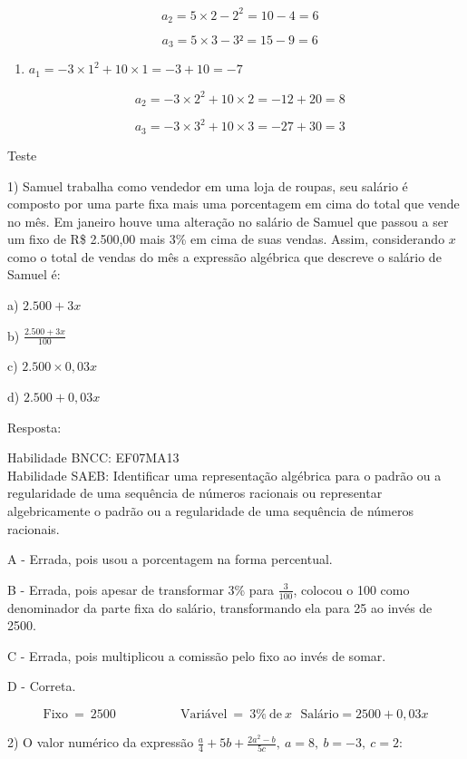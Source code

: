 {\[\text{\ \ \ \ \ }a_{2} = 5 \times 2 - 2^2 = 10 - 4 = 6\]

\[{\text{\ \ \ \ \ }a}_{3} = 5 \times 3 - 3² = 15 - 9 = 6\]

\begin{enumerate}
\def\labelenumi{\alph{enumi})}
\setcounter{enumi}{3}
\tightlist
\item
  \(a_{1} = - 3 \times 1^{2} + 10 \times 1 = - 3 + 10 = - 7\)
\end{enumerate}

\[\text{\ \ \ \ \ }a_{2} = - 3 \times 2^{2} + 10 \times 2 = - 12 + 20 = 8\]

\[{\text{\ \ \ \ \ }a}_{3} = - 3 \times 3^{2} + 10 \times 3 = - 27 + 30 = 3\]

Teste

1) Samuel trabalha como vendedor em uma loja de roupas, seu salário é
composto por uma parte fixa mais uma porcentagem em cima do total que
vende no mês. Em janeiro houve uma alteração no salário de Samuel que
passou a ser um fixo de R\$ 2.500,00 mais 3\% em cima de suas vendas.
Assim, considerando \(x\) como o total de vendas do mês a expressão
algébrica que descreve o salário de Samuel é:

a) \(2.500 + 3x\)

b) \(\frac{2.500 + 3x}{100}\)

c) \(2.500 \times 0,03x\)

d) \(2.500 + 0,03x\)

Resposta:

Habilidade BNCC: EF07MA13\\
Habilidade SAEB: Identificar uma representação algébrica para o padrão
ou a regularidade de uma sequência de números racionais ou representar
algebricamente o padrão ou a regularidade de uma sequência de números
racionais.

A - Errada, pois usou a porcentagem na forma percentual.

B - Errada, pois apesar de transformar 3\% para \(\frac{3}{100}\),
colocou o 100 como denominador da parte fixa do salário, transformando
ela para 25 ao invés de 2500.

C - Errada, pois multiplicou a comissão pelo fixo ao invés de somar.

D - Correta.

\[\text{Fixo}\  = \ 2500\ \ \ \ \ \ \ \ \ \ \ \ \ \ \ \ \ \ \ \ \ \ \ \text{Vari}á\text{vel}\  = \ 3\%\ \text{de}\ x\text{\ \ \ \ \ \ \ \ \ \ \ \ \ \ \ \ \ }\text{Sal}á\text{rio} = 2500 + 0,03x\]

2) O valor numérico da expressão
\(\frac{a}{4} + 5b + \frac{2a^{2} - b}{5c},\ a = 8,\ b = - 3,\ c = 2\):

}

